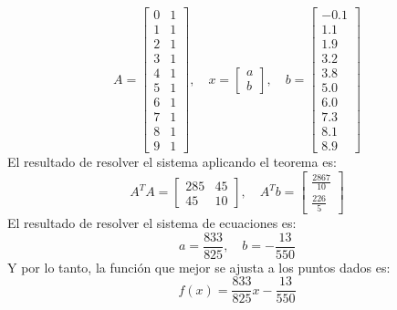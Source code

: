 \documentclass{article}
\begin{document}
\begin{equation}
    A = \begin{bmatrix}
        0 & 1 \\
        1 & 1 \\
        2 & 1 \\
        3 & 1 \\
        4 & 1 \\
        5 & 1 \\
        6 & 1 \\
        7 & 1 \\
        8 & 1 \\
        9 & 1
    \end{bmatrix}, \quad x = \begin{bmatrix}
        a \\
        b
    \end{bmatrix}, \quad b = \begin{bmatrix}
        -0.1 \\
        1.1 \\
        1.9 \\
        3.2 \\
        3.8 \\
        5.0 \\
        6.0 \\
        7.3 \\
        8.1 \\
        8.9
    \end{bmatrix}
\end{equation}
El resultado de resolver el sistema aplicando el teorema es:
\begin{equation}
    A^TA = \begin{bmatrix}
        285 & 45 \\
        45 & 10
    \end{bmatrix}, \quad A^Tb = \begin{bmatrix}
        \frac{2867}{10} \\
        \frac{226}{5}
    \end{bmatrix}
\end{equation}
El resultado de resolver el sistema de ecuaciones es:
\begin{equation}
    a = \frac{833}{825}, \quad b = -\frac{13}{550}
\end{equation}
Y por lo tanto, la función que mejor se ajusta a los puntos dados es:
\begin{equation}
    f(x) = \frac{833}{825}x - \frac{13}{550}
\end{equation}
\end{document}
